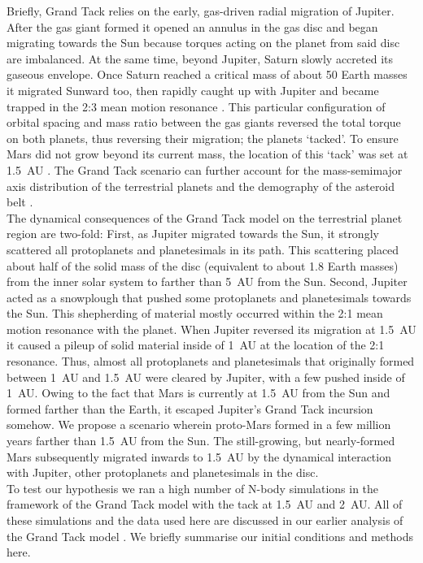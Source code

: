 \documentclass[preprint,5p,times,authoryear]{elsarticle}
\begin{document}
Briefly, Grand Tack relies on the early, gas-driven radial migration of Jupiter. After the gas giant formed it opened an annulus in 
the gas disc and began migrating towards the Sun \citep{LP86} because torques acting on the planet from said disc are imbalanced. At 
the same time, beyond Jupiter, Saturn slowly accreted its gaseous envelope. Once Saturn reached a critical mass of about 50 Earth 
masses it migrated Sunward too, then rapidly caught up with Jupiter and became trapped in the 2:3 mean motion resonance \citep{MS01}. 
This particular configuration of orbital spacing and mass ratio between the gas giants reversed the total torque on both planets, thus 
reversing their migration; the planets ‘tacked’. To ensure Mars did not grow beyond its current mass, the location of this ‘tack’ was 
set at 1.5~AU \citep{W11}. The Grand Tack scenario can further account for the mass-semimajor axis distribution of the terrestrial 
planets and the demography of the asteroid belt \citep{W11,DC14}.\\

The dynamical consequences of the Grand Tack model on the terrestrial planet region are two-fold: First, as Jupiter migrated towards 
the Sun, it strongly scattered all protoplanets and planetesimals in its path. This scattering placed about half of the solid mass of 
the disc (equivalent to about 1.8 Earth masses) from the inner solar system to farther than 5~AU from the Sun. Second, Jupiter acted 
as a snowplough that pushed some protoplanets and planetesimals towards the Sun. This shepherding of material mostly occurred within 
the 2:1 mean motion resonance with the planet. When Jupiter reversed its migration at 1.5~AU it caused a pileup of solid material 
inside of 1~AU at the location of the 2:1 resonance. Thus, almost all protoplanets and planetesimals that originally formed between 
1~AU and 1.5~AU were cleared by Jupiter, with a few pushed inside of 1~AU. Owing to the fact that Mars is currently at 1.5~AU from the 
Sun and formed farther than the Earth, it escaped Jupiter’s Grand Tack incursion somehow. We propose a scenario wherein proto-Mars 
formed in a few million years \citep{D11,TD14} farther than 1.5~AU from the Sun. The still-growing, but nearly-formed Mars 
subsequently migrated inwards to 1.5~AU by the dynamical interaction with Jupiter, other protoplanets and planetesimals in the disc. \\

To test our hypothesis we ran a high number of N-body simulations in the framework of the Grand Tack model with the tack at 1.5~AU and 
2~AU. All of these simulations and the data used here are discussed in our earlier analysis of the Grand Tack model \citep{B16}. We 
briefly summarise our initial conditions and methods here.\\
\end{document}
